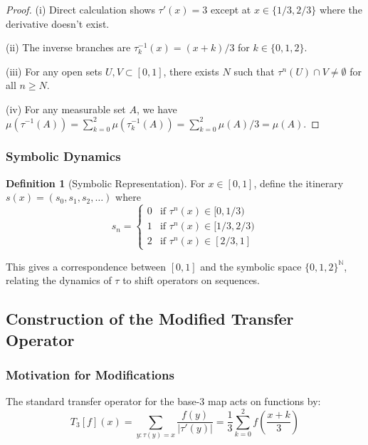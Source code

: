 \documentclass[12pt,letterpaper]{article}
\theoremstyle{plain}
\theoremstyle{definition}
\newtheorem{definition}[theorem]{Definition}
\theoremstyle{remark}
\newcommand{\N}{\mathbb{N}}
\newcommand{\standardop}{T_3}
\begin{document}
\begin{proof}
(i) Direct calculation shows $\tau'(x) = 3$ except at $x \in \{1/3, 2/3\}$ where the derivative doesn't exist.

(ii) The inverse branches are $\tau_k^{-1}(x) = (x+k)/3$ for $k \in \{0,1,2\}$.

(iii) For any open sets $U, V \subset [0,1]$, there exists $N$ such that $\tau^n(U) \cap V \neq \emptyset$ for all $n \geq N$.

(iv) For any measurable set $A$, we have $\mu(\tau^{-1}(A)) = \sum_{k=0}^2 \mu(\tau_k^{-1}(A)) = \sum_{k=0}^2 \mu(A)/3 = \mu(A)$.
\end{proof}

\subsubsection{Symbolic Dynamics}

\begin{definition}[Symbolic Representation]\label{def:symbolic}
For $x \in [0,1]$, define the itinerary $s(x) = (s_0, s_1, s_2, \ldots)$ where
\begin{equation}
s_n = \begin{cases}
0 & \text{if } \tau^n(x) \in [0, 1/3) \\
1 & \text{if } \tau^n(x) \in [1/3, 2/3) \\
2 & \text{if } \tau^n(x) \in [2/3, 1]
\end{cases}
\end{equation}
\end{definition}

This gives a correspondence between $[0,1]$ and the symbolic space $\{0,1,2\}^{\N}$, relating the dynamics of $\tau$ to shift operators on sequences.

\subsection{Construction of the Modified Transfer Operator}

\subsubsection{Motivation for Modifications}

The standard transfer operator for the base-3 map acts on functions by:
\begin{equation}
\standardop[f](x) = \sum_{y: \tau(y)=x} \frac{f(y)}{|\tau'(y)|} = \frac{1}{3}\sum_{k=0}^{2} f\left(\frac{x+k}{3}\right)
\end{equation}
\end{document}
